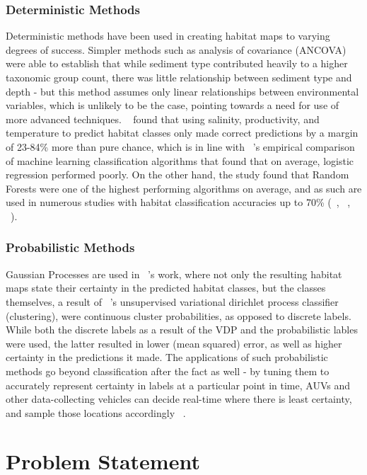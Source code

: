 \documentclass[10pt,sts]{article}
\begin{document}
\begin{multicols}{2}
    \subsubsection{Deterministic Methods}

    Deterministic methods have been used in creating habitat maps to varying degrees of success. Simpler methods such as analysis of covariance (ANCOVA) were able to establish that while sediment type contributed heavily to a higher taxonomic group count, there was little relationship between sediment type and depth - but this method assumes only linear relationships between environmental variables, which is unlikely to be the case, pointing towards a need for use of more advanced techniques. ~\citet{belanger12} found that using salinity, productivity, and temperature to predict habitat classes only made correct predictions by a margin of 23-84\% more than pure chance, which is in line with ~\citet{caruana06}'s empirical comparison of machine learning classification algorithms that found that on average, logistic regression performed poorly. On the other hand, the study found that Random Forests were one of the highest performing algorithms on average, and as such are used in numerous studies with habitat classification accuracies up to 70\% (~\citet{lucieer13}, ~\citet{seiler12}, ~\citet{hasan14}).
    
    \subsubsection{Probabilistic Methods}

    Gaussian Processes are used in ~\citet{bender12}'s work, where not only the resulting habitat maps state their certainty in the predicted habitat classes, but the classes themselves, a result of ~\citet{steinberg11}'s unsupervised variational dirichlet process classifier (clustering), were continuous cluster probabilities, as opposed to discrete labels. While both the discrete labels as a result of the VDP and the probabilistic lables were used, the latter resulted in lower (mean squared) error, as well as higher certainty in the predictions it made. The applications of such probabilistic methods go beyond classification after the fact as well - by tuning them to accurately represent certainty in labels at a particular point in time, AUVs and other data-collecting vehicles can decide real-time where there is least certainty, and sample those locations accordingly ~\citep{rigby10}.

    \section{Problem Statement}


\end{multicols}
\end{document}

